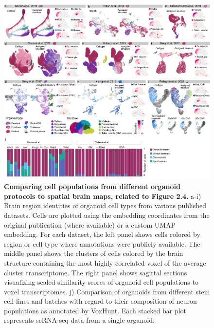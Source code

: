 \begin{figure}[h!]
    \centering
	\includegraphics[width=\textwidth]{figures/voxhunt/Supp_5}
    \caption{\textbf{Comparing cell populations from different organoid protocols to spatial brain maps, related to Figure 2.4.} a-i) Brain region identities of organoid cell types from various published datasets. Cells are plotted using the embedding coordinates from the original publication (where available) or a custom UMAP embedding. For each dataset, the left panel shows cells colored by region or cell type where annotations were publicly available. The middle panel shows the clusters of cells colored by the brain structure containing the most highly correlated voxel of the average cluster transcriptome. The right panel shows sagittal sections visualizing scaled similarity scores of organoid cell populations to voxel transcriptomes. j) Comparison of organoids from different stem cell lines and batches with regard to their composition of neuron populations as annotated by VoxHunt. Each stacked bar plot represents scRNA-seq data from a single organoid.}
    \label{fig:voxS5}
\end{figure}


